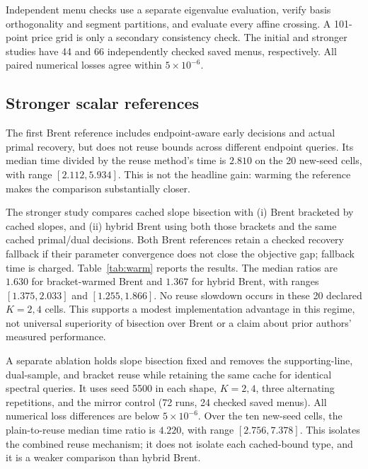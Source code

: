 \documentclass[11pt]{article}
\begin{document}
Independent menu checks use a separate eigenvalue evaluation, verify basis
orthogonality and segment partitions, and evaluate every affine crossing.
A 101-point price grid is only a secondary consistency check. The initial
and stronger studies have 44 and 66 independently checked saved menus,
respectively. All paired numerical losses agree within $5\times10^{-6}$.

\subsection{Stronger scalar references}
The first Brent reference includes endpoint-aware early decisions and actual
primal recovery, but does not reuse bounds across different endpoint queries.
Its median time divided by the reuse method's time is $2.810$ on the 20
new-seed cells, with range $[2.112,5.934]$. This is not the headline gain:
warming the reference makes the comparison substantially closer.

The stronger study compares cached slope bisection with (i) Brent bracketed
by cached slopes, and (ii) hybrid Brent using both those brackets and the
same cached primal/dual decisions. Both Brent references retain a checked
recovery fallback if their parameter convergence does not close the objective
gap; fallback time is charged. Table~\ref{tab:warm} reports the results.
The median ratios are $1.630$ for bracket-warmed Brent and $1.367$ for
hybrid Brent, with ranges $[1.375,2.033]$ and $[1.255,1.866]$.
No reuse slowdown occurs in these 20 declared $K=2,4$ cells. This supports
a modest implementation advantage in this regime, not universal superiority
of bisection over Brent or a claim about prior authors' measured performance.

A separate ablation holds slope bisection fixed and removes the supporting-line,
dual-sample, and bracket reuse while retaining the same cache for identical
spectral queries. It uses seed 5500 in each shape, $K=2,4$, three alternating
repetitions, and the mirror control (72 runs, 24 checked saved menus).
All numerical loss differences are below $5\times10^{-6}$. Over the ten
new-seed cells, the plain-to-reuse median time ratio is $4.220$, with range
$[2.756,7.378]$. This isolates the combined reuse mechanism; it does not
isolate each cached-bound type, and it is a weaker comparison than hybrid Brent.

\begin{table}[t]\centering
\caption{Stronger-reference study. Each row aggregates four cells (two seeds,
two budgets). Ratios are reference seconds divided by proposed seconds;
larger values favor reuse with slope bisection. Memory is retained spectrum
and sample storage, not process peak RSS.}\label{tab:warm}

\end{table}
\end{document}
